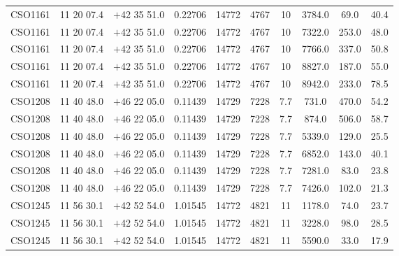 \begin{landscape}
\begin{center}
\begin{longtable}{l c c c c c c c c c}
CSO1161  &                 11 20 07.4  &         $+$42 35 51.0  &       0.22706  & 14772  &   4767  &       10  &        3784.0  &  69.0  &   40.4  \\
CSO1161  &                 11 20 07.4  &         $+$42 35 51.0  &       0.22706  & 14772  &   4767  &       10  &        7322.0  &  253.0  &  48.0  \\
CSO1161  &                 11 20 07.4  &         $+$42 35 51.0  &       0.22706  & 14772  &   4767  &       10  &        7766.0  &  337.0  &  50.8  \\
CSO1161  &                 11 20 07.4  &         $+$42 35 51.0  &       0.22706  & 14772  &   4767  &       10  &        8827.0  &  187.0  &  55.0  \\
CSO1161  &                 11 20 07.4  &         $+$42 35 51.0  &       0.22706  & 14772  &   4767  &       10  &        8942.0  &  233.0  &  78.5  \\
CSO1208  &                 11 40 48.0  &         $+$46 22 05.0  &       0.11439  & 14729  &   7228  &       7.7  &       731.0  &   470.0  &  54.2  \\
CSO1208  &                 11 40 48.0  &         $+$46 22 05.0  &       0.11439  & 14729  &   7228  &       7.7  &       874.0  &   506.0  &  58.7  \\
CSO1208  &                 11 40 48.0  &         $+$46 22 05.0  &       0.11439  & 14729  &   7228  &       7.7  &       5339.0  &  129.0  &  25.5  \\
CSO1208  &                 11 40 48.0  &         $+$46 22 05.0  &       0.11439  & 14729  &   7228  &       7.7  &       6852.0  &  143.0  &  40.1  \\
CSO1208  &                 11 40 48.0  &         $+$46 22 05.0  &       0.11439  & 14729  &   7228  &       7.7  &       7281.0  &  83.0  &   23.8  \\
CSO1208  &                 11 40 48.0  &         $+$46 22 05.0  &       0.11439  & 14729  &   7228  &       7.7  &       7426.0  &  102.0  &  21.3  \\
CSO1245  &                 11 56 30.1  &         $+$42 52 54.0  &       1.01545  & 14772  &   4821  &       11  &        1178.0  &  74.0  &   23.7  \\
CSO1245  &                 11 56 30.1  &         $+$42 52 54.0  &       1.01545  & 14772  &   4821  &       11  &        3228.0  &  98.0  &   28.5  \\
CSO1245  &                 11 56 30.1  &         $+$42 52 54.0  &       1.01545  & 14772  &   4821  &       11  &        5590.0  &  33.0  &   17.9  \\

\end{longtable}
\end{center}
\end{landscape}
